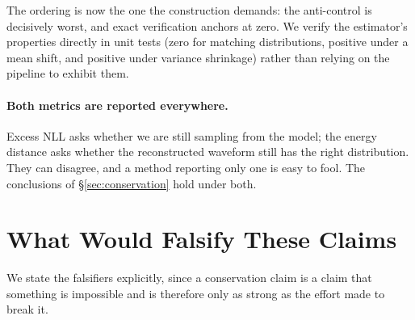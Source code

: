 The ordering is now the one the construction demands: the anti-control is decisively worst, and exact
verification anchors at zero. We verify the estimator's properties directly in unit tests (zero for
matching distributions, positive under a mean shift, and positive under variance shrinkage) rather
than relying on the pipeline to exhibit them.

\paragraph{Both metrics are reported everywhere.} Excess NLL asks whether we are still sampling from
the model; the energy distance asks whether the reconstructed waveform still has the right
distribution. They can disagree, and a method reporting only one is easy to fool. The conclusions of
\S\ref{sec:conservation} hold under both.

\section{What Would Falsify These Claims}
\label{app:falsifiers}

We state the falsifiers explicitly, since a conservation claim is a claim that something is
impossible and is therefore only as strong as the effort made to break it.

